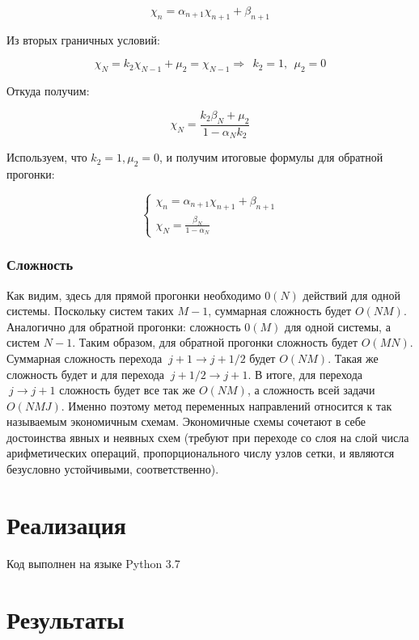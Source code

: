 \documentclass[a4paper]{article}
\begin{document}
$$
\chi_n = \alpha _{n+1}\chi_{n+1}+\beta _{n+1}
$$

Из вторых граничных условий:

$$
\chi_N=k_2\chi_{N-1} +\mu _2 = \chi_{N-1}\Rightarrow ~~k_2=1,~~\mu _2=0
$$

Откуда получим:

$$
\chi_N=\frac{k_2\beta _N+\mu _2}{1-\alpha _Nk_2}
$$

Используем, что $k_2=1,\mu _2=0$, и получим итоговые формулы для обратной прогонки:

\begin{equation}
\left\{\begin{array}{l}{\chi_{n}=\alpha_{n+1} \chi_{n+1}+\beta_{n+1}} \\ {\chi_{N}=\frac{\beta_{N}}{1-\alpha_{N}}}\end{array}\right.
\end{equation}

\subsubsection{Сложность}

Как видим, здесь для прямой прогонки необходимо $0(N)$ действий  для одной системы. Поскольку систем таких $M-1$, суммарная сложность будет $O(NM)$. 
Аналогично для обратной прогонки: сложность $0(M)$ для одной системы, а систем $N-1$. Таким образом, для обратной прогонки сложность будет $O(MN)$. 
Суммарная сложность перехода $~j + 1\longrightarrow j+1/2$ будет $O(NM)$. 
Такая же сложность будет и для перехода $~j + 1/2\longrightarrow j+1$. 
В итоге, для перехода $~j\longrightarrow j+1$ сложность будет все так же $O(NM)$, а сложность всей задачи $O(NMJ)$. Именно поэтому метод переменных направлений относится к так называемым экономичным схемам.
Экономичные схемы сочетают в себе достоинства явных и неявных схем (требуют при переходе со слоя на слой числа арифметических операций, пропорционального числу узлов сетки, и являются безусловно устойчивыми, соответственно). 

\section{Реализация}
Код выполнен на языке Python 3.7


\section{Результаты}
\end{document}
